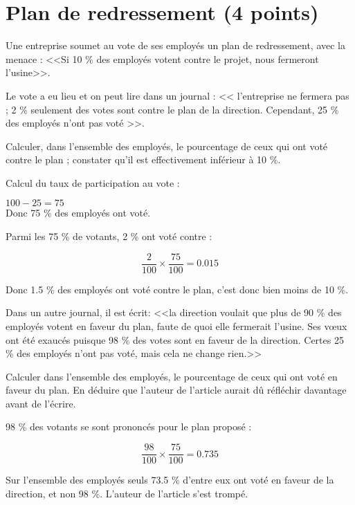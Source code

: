 \section{Plan de redressement (4 points)}

Une entreprise soumet au vote de ses employés un plan de redressement, avec la menace : <<Si 10 \% des employés votent contre le projet, nous fermeront l'usine>>.

Le vote a eu lieu et on peut lire dans un journal : << l'entreprise ne fermera pas ; 2 \% seulement des votes sont contre le plan de la direction. Cependant, 25 \% des employés n'ont pas voté >>.

\begin{questions}

	\question Calculer, dans l'ensemble des employés, le pourcentage de ceux qui ont voté contre le plan ; constater qu'il est effectivement inférieur à 10 \%.
	
	\begin{solution}
		Calcul du taux de participation au vote :
		
		$100 - 25 = 75 $ \\
		Donc 75 \% des employés ont voté.
		
		Parmi les 75 \% de votants, 2 \% ont voté contre :
		
		\begin{equation*}
			\frac{2}{100} \times \dfrac{75}{100} = \num{0.015}
		\end{equation*}
		
		Donc \num{1.5} \% des employés ont voté contre le plan, c'est donc bien moins de 10 \%. 
		
	\end{solution}
	
	\question Dans un autre journal, il est écrit: <<la direction voulait que plus de 90 \% des employés votent en faveur du plan, faute de quoi elle fermerait l'usine. Ses v\oe ux ont été exaucés puisque 98 \% des votes sont en faveur de la direction. Certes 25 \% des employés n'ont pas voté, mais cela ne change rien.>>
	
	Calculer dans l'ensemble des employés, le pourcentage de ceux qui ont voté en faveur du plan. En déduire que l'auteur de l'article aurait dû réfléchir davantage avant de l'écrire.  
	
		\begin{solution}
			98 \% des votants se sont prononcés pour le plan proposé :
			
			\begin{equation*}
				\frac{98}{100} \times \dfrac{75}{100} = \num{0.735}
			\end{equation*}
			
			Sur l'ensemble des employés seuls \num{73.5} \% d'entre eux ont voté en faveur de la direction, et non 98 \%. L'auteur de l'article s'est trompé.
		\end{solution}
	
	
\end{questions} 
